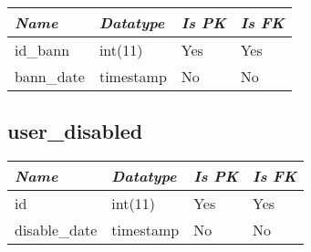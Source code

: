 \begin{table}[h!]
\centering
\small

    \begin{tabular}{ | m{} | m{} | m{} | m{} | }
    \hline
        \cellcolor{blue!25}\textbf{\textit{Name}} &

        \cellcolor{blue!25}\textbf{\textit{Datatype}} &
        \cellcolor{blue!25}\textbf{\textit{Is PK}} &
        \cellcolor{blue!25}\textbf{\textit{Is FK}} \\
    \hline
    \hline
        id\_bann & int(11) & Yes & Yes \\
    \hline
        bann\_date & timestamp & No & No \\
    \hline
    \end{tabular}

\end{table}

\subsection{user\_disabled}

\begin{table}[h!]
\centering
\small

    \begin{tabular}{ | m{} | m{} | m{} | m{} | }
    \hline
        \cellcolor{blue!25}\textbf{\textit{Name}} &

        \cellcolor{blue!25}\textbf{\textit{Datatype}} &
        \cellcolor{blue!25}\textbf{\textit{Is PK}} &
        \cellcolor{blue!25}\textbf{\textit{Is FK}} \\
    \hline
    \hline
        id & int(11) & Yes & Yes \\
    \hline
        disable\_date & timestamp & No & No \\
    \hline
    \end{tabular}

\end{table}

